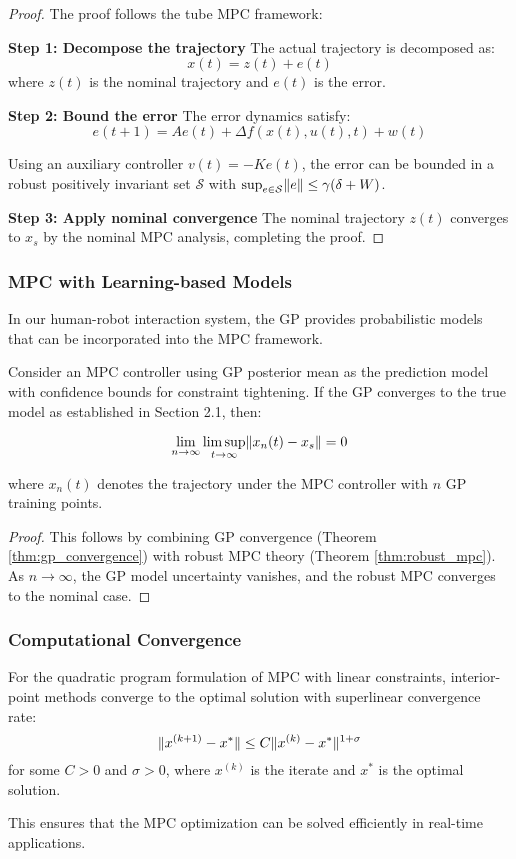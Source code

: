 \begin{proof}
The proof follows the tube MPC framework:

\textbf{Step 1: Decompose the trajectory}
The actual trajectory is decomposed as:
$$x(t) = z(t) + e(t)$$
where $z(t)$ is the nominal trajectory and $e(t)$ is the error.

\textbf{Step 2: Bound the error}
The error dynamics satisfy:
$$e(t+1) = A e(t) + \Delta f(x(t), u(t), t) + w(t)$$

Using an auxiliary controller $v(t) = -K e(t)$, the error can be bounded in a robust positively invariant set $\mathcal{S}$ with $\sup_{e \in \mathcal{S}} \lVert e\rVert \leq \gamma(\delta + W)$.

\textbf{Step 3: Apply nominal convergence}
The nominal trajectory $z(t)$ converges to $x_s$ by the nominal MPC analysis, completing the proof.
\end{proof}

\subsubsection{MPC with Learning-based Models}

In our human-robot interaction system, the GP provides probabilistic models that can be incorporated into the MPC framework.

\begin{theorem}
\label{thm:mpc_gp}
Consider an MPC controller using GP posterior mean as the prediction model with confidence bounds for constraint tightening. If the GP converges to the true model as established in Section 2.1, then:

$$\lim_{n \to \infty} \limsup_{t \to \infty} \lVert x_n(t) - x_s\rVert = 0$$

where $x_n(t)$ denotes the trajectory under the MPC controller with $n$ GP training points.
\end{theorem}

\begin{proof}
This follows by combining GP convergence (Theorem \ref{thm:gp_convergence}) with robust MPC theory (Theorem \ref{thm:robust_mpc}). As $n \to \infty$, the GP model uncertainty vanishes, and the robust MPC converges to the nominal case.
\end{proof}

\subsubsection{Computational Convergence}

\begin{theorem}
\label{thm:mpc_optimization}
For the quadratic program formulation of MPC with linear constraints, interior-point methods converge to the optimal solution with superlinear convergence rate:
$$\lVert x^{(k+1)} - x^*\rVert \leq C \lVert x^{(k)} - x^*\rVert^{1+\sigma}$$
for some $C > 0$ and $\sigma > 0$, where $x^{(k)}$ is the iterate and $x^*$ is the optimal solution.
\end{theorem}

This ensures that the MPC optimization can be solved efficiently in real-time applications.